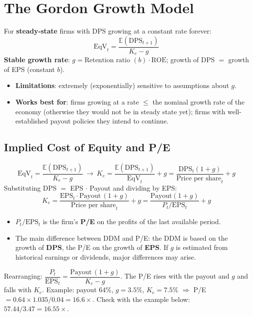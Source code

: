 \section{The Gordon Growth Model}

\begin{keybox}
For \textbf{steady-state} firms with DPS growing at a constant rate forever:
\[
\text{EqV}_t=\frac{\mathbb{E}(\text{DPS}_{t+1})}{K_e-g}
\]
\textbf{Stable growth rate}: $g=\text{Retention ratio }(b)\cdot\text{ROE}$; growth of DPS $=$ growth of EPS (constant $b$).
\end{keybox}
\begin{itemize}
  \item \textbf{Limitations}: extremely (exponentially) sensitive to assumptions about $g$.
  \item \textbf{Works best for}: firms growing at a rate $\leq$ the nominal growth rate of the economy (otherwise they would not be in steady state yet); firms with well-established payout policies they intend to continue.
\end{itemize}

\subsection{Implied Cost of Equity and P/E}
\begin{keybox}
\[
\text{EqV}_t=\frac{\mathbb{E}(\text{DPS}_{t+1})}{K_e-g}\ \rightarrow\ K_e=\frac{\mathbb{E}(\text{DPS}_{t+1})}{\text{EqV}_t}+g=\frac{\text{DPS}_t(1+g)}{\text{Price per share}_t}+g
\]
Substituting DPS $=$ EPS $\cdot$ Payout and dividing by EPS:
\[
K_e=\frac{\text{EPS}_t\cdot\text{Payout}\,(1+g)}{\text{Price per share}_t}+g=\frac{\text{Payout}(1+g)}{P_t/\text{EPS}_t}+g
\]
\end{keybox}
\begin{itemize}
  \item $P_t/\text{EPS}_t$ is the firm's \textbf{P/E} on the profits of the last available period.
  \item The main difference between DDM and P/E: the DDM is based on the growth of \textbf{DPS}, the P/E on the growth of \textbf{EPS}. If $g$ is estimated from historical earnings or dividends, major differences may arise.
\end{itemize}
\begin{addbox}
Rearranging: $\dfrac{P_t}{\text{EPS}_t}=\dfrac{\text{Payout}\,(1+g)}{K_e-g}$. The P/E rises with the payout and $g$ and falls with $K_e$. Example: payout 64\%, $g=3.5\%$, $K_e=7.5\%$ $\Rightarrow$ P/E $=0.64\times1.035/0.04=16.6\times$. Check with the example below: $57.44/3.47=16.55\times$.
\end{addbox}

